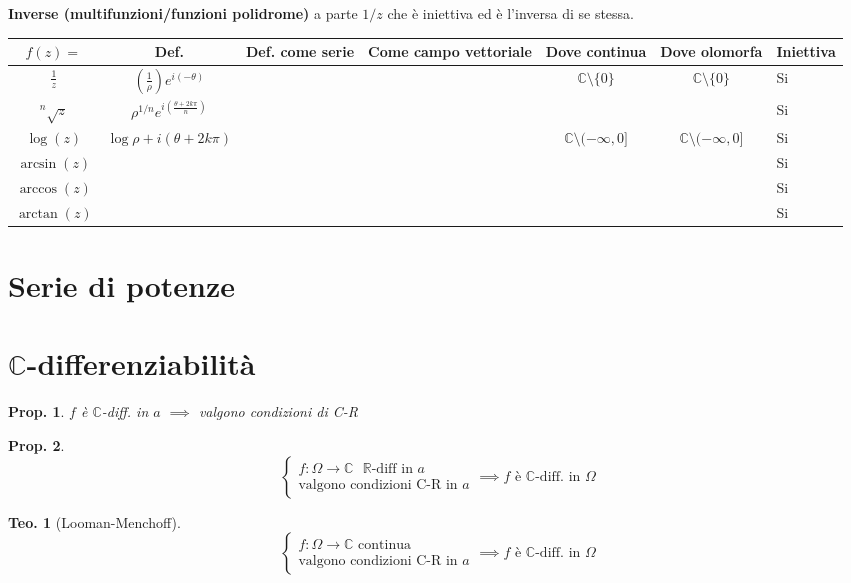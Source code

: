 \documentclass[a4paper,10pt]{article}
\newcommand{\re}{\mathbb{R}} %
\newcommand{\im}{\mathbb{C}} %
\theoremstyle{indentdefinition}
\theoremstyle{indenttheorem}
\newtheorem{thm}{Teo.}
\newtheorem{prop}{Prop.}
\theoremstyle{myremark}
\theoremstyle{indentgeneral}
\begin{document}
\textbf{Inverse (multifunzioni/funzioni polidrome)} a parte $1/z$ che è iniettiva ed è l'inversa di se stessa.
\begin{table}[h]
    \centering
    \begin{tabular}{|c|c|c|c|c|c|l|} \hline 
         $f(z)=$&  Def. &Def. come serie&  Come campo  vettoriale&  Dove continua& Dove olomorfa &Iniettiva \\ \hline 
         $\frac{1}{z}$&  $(\frac{1}{\rho})e^{i(-\theta)}$&  &  &  $\im\setminus\{0\}$&  $\im\setminus\{0\}$&Si\\ \hline 
         $^n\sqrt{z}$&  $\rho^{1/n}e^{i(\frac{\theta+2k\pi}{n})}$&  &  &  &  &Si\\ \hline 
         $\log(z)$&  $\log \rho + i(\theta+2k\pi)$&  &  &  $\im\setminus(-\infty, 0]$&  $\im\setminus(-\infty, 0]$& Si\\ \hline 
         $\arcsin(z)$&  &  &  &  &  & Si\\ \hline 
         $\arccos(z)$&  &  &  &  &  & Si\\ \hline 
         $\arctan(z)$&  &  &  &  &  & Si\\ \hline
    \end{tabular}
\end{table}

\section{Serie di potenze}

\section{$\mathbb{C}$-differenziabilità}

\begin{prop}
    $f$ è $\mathbb{C}$-diff. in $a$ $\implies$ valgono condizioni di C-R
\end{prop}

\begin{prop}
$$
    \begin{cases}
        f:\Omega\to\mathbb{C} \text{ $\re$-diff in $a$} \\
        \text{valgono condizioni C-R in $a$}
    \end{cases}
    \implies f \text{ è $\mathbb{C}$-diff.  in $\Omega$}
    $$
\end{prop}

\begin{thm}[Looman-Menchoff]
$$
    \begin{cases}
        f:\Omega\to\mathbb{C} \text{ continua} \\
        \text{valgono condizioni C-R in $a$}
    \end{cases}
    \implies f \text{ è $\mathbb{C}$-diff.  in $\Omega$}
    $$
\end{thm}
\end{document}
